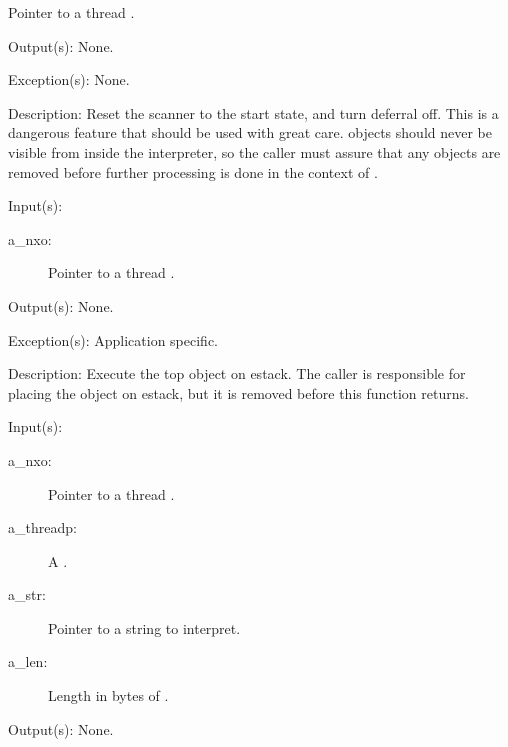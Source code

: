 \begin{capi}
\begin{capilist}
\begin{description}
			Pointer to a thread .
		\end{description}
	\item[Output(s): ] None.
	\item[Exception(s): ] None.
	\item[Description: ]
		Reset the scanner to the start state, and turn deferral off.
		This is a dangerous feature that should be used with great
		care.   objects should never be visible from
		inside the interpreter, so the caller must assure that any
		 objects are removed before further
		processing is done in the context of .
	\end{capilist}
\label{nxo_thread_loop}
	\begin{capilist}
	\item[Input(s): ]
		\begin{description}\item[]
		\item[a\_nxo: ]
			Pointer to a thread .
		\end{description}
	\item[Output(s): ] None.
	\item[Exception(s): ] Application specific.
	\item[Description: ]
		Execute the top object on estack.  The caller is responsible
		for placing the object on estack, but it is removed before this
		function returns.
	\end{capilist}
\label{nxo_thread_interpret}
	\begin{capilist}
	\item[Input(s): ]
		\begin{description}\item[]
		\item[a\_nxo: ]
			Pointer to a thread \classname{nxo}.
		\item[a\_threadp: ]
			A \classname{threadp}.
		\item[a\_str: ]
			Pointer to a string to interpret.
		\item[a\_len: ]
			Length in bytes of \cvar{a\_str}.
		\end{description}
	\item[Output(s): ] None.

\end{capilist}
\end{capi}
